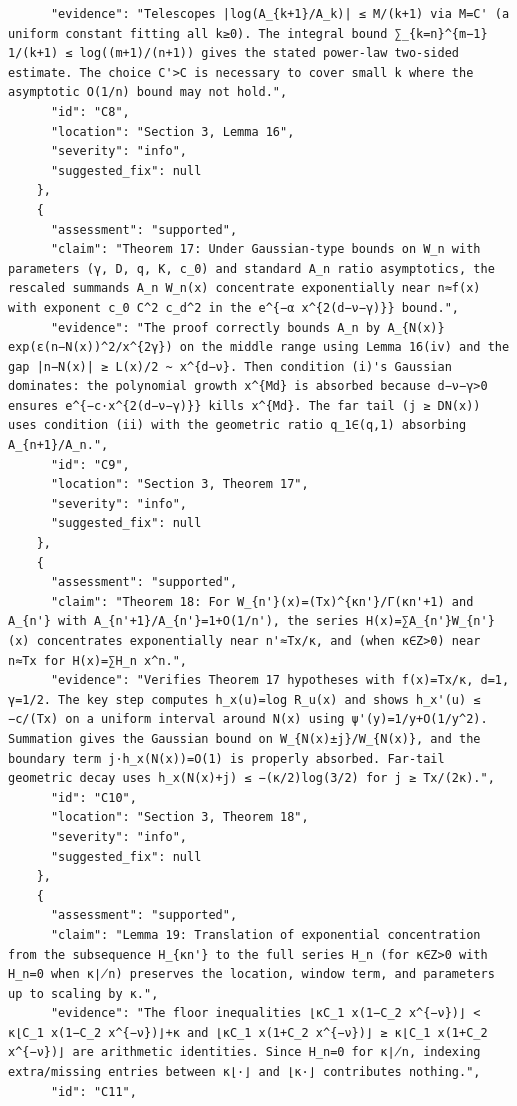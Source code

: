 \documentclass[11pt]{article}
\begin{document}
\begin{verbatim}
      "evidence": "Telescopes |log(A_{k+1}/A_k)| ≤ M/(k+1) via M=C' (a uniform constant fitting all k≥0). The integral bound ∑_{k=n}^{m−1} 1/(k+1) ≤ log((m+1)/(n+1)) gives the stated power-law two-sided estimate. The choice C'>C is necessary to cover small k where the asymptotic O(1/n) bound may not hold.",
      "id": "C8",
      "location": "Section 3, Lemma 16",
      "severity": "info",
      "suggested_fix": null
    },
    {
      "assessment": "supported",
      "claim": "Theorem 17: Under Gaussian-type bounds on W_n with parameters (γ, D, q, K, c_0) and standard A_n ratio asymptotics, the rescaled summands A_n W_n(x) concentrate exponentially near n≈f(x) with exponent c_0 C^2 c_d^2 in the e^{−α x^{2(d−ν−γ)}} bound.",
      "evidence": "The proof correctly bounds A_n by A_{N(x)} exp(ε(n−N(x))^2/x^{2γ}) on the middle range using Lemma 16(iv) and the gap |n−N(x)| ≥ L(x)/2 ~ x^{d−ν}. Then condition (i)'s Gaussian dominates: the polynomial growth x^{Md} is absorbed because d−ν−γ>0 ensures e^{−c·x^{2(d−ν−γ)}} kills x^{Md}. The far tail (j ≥ DN(x)) uses condition (ii) with the geometric ratio q_1∈(q,1) absorbing A_{n+1}/A_n.",
      "id": "C9",
      "location": "Section 3, Theorem 17",
      "severity": "info",
      "suggested_fix": null
    },
    {
      "assessment": "supported",
      "claim": "Theorem 18: For W_{n'}(x)=(Tx)^{κn'}/Γ(κn'+1) and A_{n'} with A_{n'+1}/A_{n'}=1+O(1/n'), the series H(x)=∑A_{n'}W_{n'}(x) concentrates exponentially near n'≈Tx/κ, and (when κ∈Z>0) near n≈Tx for H(x)=∑H_n x^n.",
      "evidence": "Verifies Theorem 17 hypotheses with f(x)=Tx/κ, d=1, γ=1/2. The key step computes h_x(u)=log R_u(x) and shows h_x'(u) ≤ −c/(Tx) on a uniform interval around N(x) using ψ'(y)=1/y+O(1/y^2). Summation gives the Gaussian bound on W_{N(x)±j}/W_{N(x)}, and the boundary term j·h_x(N(x))=O(1) is properly absorbed. Far-tail geometric decay uses h_x(N(x)+j) ≤ −(κ/2)log(3/2) for j ≥ Tx/(2κ).",
      "id": "C10",
      "location": "Section 3, Theorem 18",
      "severity": "info",
      "suggested_fix": null
    },
    {
      "assessment": "supported",
      "claim": "Lemma 19: Translation of exponential concentration from the subsequence H_{κn'} to the full series H_n (for κ∈Z>0 with H_n=0 when κ∤n) preserves the location, window term, and parameters up to scaling by κ.",
      "evidence": "The floor inequalities ⌊κC_1 x(1−C_2 x^{−ν})⌋ < κ⌊C_1 x(1−C_2 x^{−ν})⌋+κ and ⌊κC_1 x(1+C_2 x^{−ν})⌋ ≥ κ⌊C_1 x(1+C_2 x^{−ν})⌋ are arithmetic identities. Since H_n=0 for κ∤n, indexing extra/missing entries between κ⌊·⌋ and ⌊κ·⌋ contributes nothing.",
      "id": "C11",

\end{verbatim}
\end{document}
